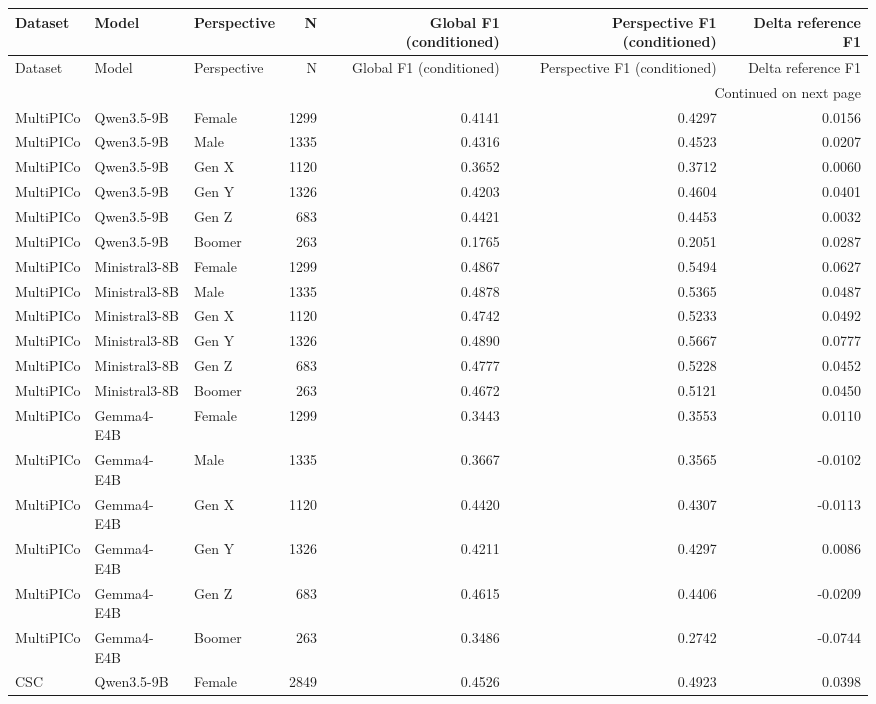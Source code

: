 \begin{longtable}{lllrrrr}
\toprule
Dataset & Model & Perspective & N & Global F1 (conditioned) & Perspective F1 (conditioned) & Delta reference F1 \\
\midrule
\endfirsthead
\toprule
Dataset & Model & Perspective & N & Global F1 (conditioned) & Perspective F1 (conditioned) & Delta reference F1 \\
\midrule
\endhead
\midrule
\multicolumn{7}{r}{Continued on next page} \\
\midrule
\endfoot
\bottomrule
\endlastfoot
MultiPICo & Qwen3.5-9B & Female & 1299 & 0.4141 & 0.4297 & 0.0156 \\
MultiPICo & Qwen3.5-9B & Male & 1335 & 0.4316 & 0.4523 & 0.0207 \\
MultiPICo & Qwen3.5-9B & Gen X & 1120 & 0.3652 & 0.3712 & 0.0060 \\
MultiPICo & Qwen3.5-9B & Gen Y & 1326 & 0.4203 & 0.4604 & 0.0401 \\
MultiPICo & Qwen3.5-9B & Gen Z & 683 & 0.4421 & 0.4453 & 0.0032 \\
MultiPICo & Qwen3.5-9B & Boomer & 263 & 0.1765 & 0.2051 & 0.0287 \\
MultiPICo & Ministral3-8B & Female & 1299 & 0.4867 & 0.5494 & 0.0627 \\
MultiPICo & Ministral3-8B & Male & 1335 & 0.4878 & 0.5365 & 0.0487 \\
MultiPICo & Ministral3-8B & Gen X & 1120 & 0.4742 & 0.5233 & 0.0492 \\
MultiPICo & Ministral3-8B & Gen Y & 1326 & 0.4890 & 0.5667 & 0.0777 \\
MultiPICo & Ministral3-8B & Gen Z & 683 & 0.4777 & 0.5228 & 0.0452 \\
MultiPICo & Ministral3-8B & Boomer & 263 & 0.4672 & 0.5121 & 0.0450 \\
MultiPICo & Gemma4-E4B & Female & 1299 & 0.3443 & 0.3553 & 0.0110 \\
MultiPICo & Gemma4-E4B & Male & 1335 & 0.3667 & 0.3565 & -0.0102 \\
MultiPICo & Gemma4-E4B & Gen X & 1120 & 0.4420 & 0.4307 & -0.0113 \\
MultiPICo & Gemma4-E4B & Gen Y & 1326 & 0.4211 & 0.4297 & 0.0086 \\
MultiPICo & Gemma4-E4B & Gen Z & 683 & 0.4615 & 0.4406 & -0.0209 \\
MultiPICo & Gemma4-E4B & Boomer & 263 & 0.3486 & 0.2742 & -0.0744 \\
CSC & Qwen3.5-9B & Female & 2849 & 0.4526 & 0.4923 & 0.0398 \\

\end{longtable}
